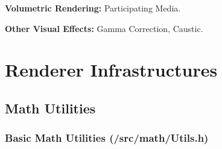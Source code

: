 \documentclass[utf8]{article}
\begin{document}
\noindent
\textbf{Volumetric Rendering: } Participating Media.

\noindent
\textbf{Other Visual Effects: } Gamma Correction, Caustic.

\section{Renderer Infrastructures}

\subsection{Math Utilities}

\subsubsection{Basic Math Utilities (/src/math/Utils.h)}
\end{document}
